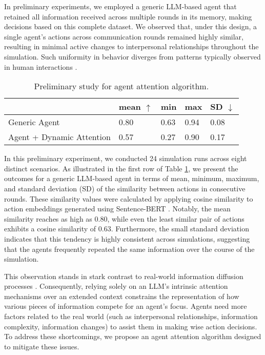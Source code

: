 In preliminary experiments, we employed a generic LLM-based agent that retained all information received across multiple rounds in its memory, making decisions based on this complete dataset. We observed that, under this design, a single agent's actions across communication rounds remained highly similar, resulting in minimal active changes to interpersonal relationships throughout the simulation. Such uniformity in behavior diverges from patterns typically observed in human interactions \cite{b73,b74,b75}.

\begin{table}[ht]
    \centering
    \footnotesize
    
    \begin{tabular}{p{3.6cm}p{0.5cm}p{0.5cm}p{0.5cm}p{0.5cm}}
         \toprule
          & mean $\uparrow$&min&max& SD $\downarrow$ \\
         \midrule
         Generic Agent &  \textcolor{bluee}{0.80}&  0.63&  0.94&  0.08\\
         \midrule
         Agent + Dynamic Attention &  0.57&  0.27&  0.90&  0.17\\
         \bottomrule
    \end{tabular}
    
    \caption{Preliminary study for agent attention algorithm.}
    \label{tab:baselinecompare}
\end{table}


In this preliminary experiment, we conducted 24 simulation runs across eight distinct scenarios. As illustrated in the first row of Table \ref{tab:baselinecompare}, we present the outcomes for a generic LLM-based agent in terms of mean, minimum, maximum, and standard deviation (SD) of the similarity between actions in consecutive rounds. These similarity values were calculated by applying cosine similarity to action embeddings generated using Sentence-BERT \cite{b70}. Notably, the mean similarity reaches as high as 0.80, while even the least similar pair of actions exhibits a cosine similarity of 0.63. Furthermore, the small standard deviation indicates that this tendency is highly consistent across simulations, suggesting that the agents frequently repeated the same information over the course of the simulation.

This observation stands in stark contrast to real-world information diffusion processes \cite{b76,b77}. Consequently, relying solely on an LLM’s intrinsic attention mechanisms over an extended context constrains the representation of how various pieces of information compete for an agent’s focus. 
Agents need more factors related to the real world (such as interpersonal relationships, information complexity, information changes) to assist them in making wise action decisions.
To address these shortcomings, we propose an agent attention algorithm designed to mitigate these issues.


